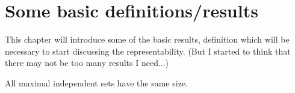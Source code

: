 \section{Some basic definitions/results}

This chapter will introduce some of the basic results, definition which will be necessary to start discussing the representability.
(But I started to think that there may not be too many results I need...)

\begin{thm}
All maximal independent sets have the same size.
\end{thm}


